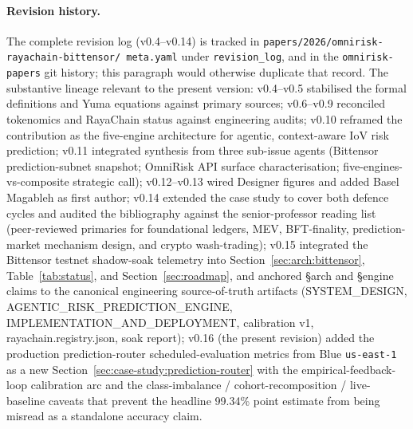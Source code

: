 \documentclass[11pt,a4paper]{article}
\begin{document}
\paragraph{Revision history.} The complete revision log
(v0.4--v0.14) is tracked in \texttt{papers/2026/omnirisk-rayachain-bittensor/
meta.yaml} under \texttt{revision\_log}, and in the \texttt{omnirisk-papers}
git history; this paragraph would otherwise duplicate that record. The
substantive lineage relevant to the present version: v0.4--v0.5 stabilised the
formal definitions and Yuma equations against primary sources;
v0.6--v0.9 reconciled tokenomics and RayaChain status against engineering
audits; v0.10 reframed the contribution as the five-engine architecture for
agentic, context-aware IoV risk prediction; v0.11 integrated synthesis from
three sub-issue agents (Bittensor prediction-subnet snapshot; OmniRisk API
surface characterisation; five-engines-vs-composite strategic call);
v0.12--v0.13 wired Designer figures and added Basel Magableh as first author;
v0.14 extended the case study to cover both defence cycles and audited the
bibliography against the senior-professor reading list (peer-reviewed primaries
for foundational ledgers, MEV, BFT-finality, prediction-market mechanism design,
and crypto wash-trading); v0.15 integrated the Bittensor testnet shadow-soak telemetry into
Section~\ref{sec:arch:bittensor}, Table~\ref{tab:status}, and
Section~\ref{sec:roadmap}, and anchored §arch and §engine claims to the
canonical engineering source-of-truth artifacts (SYSTEM\_DESIGN,
AGENTIC\_RISK\_PREDICTION\_ENGINE, IMPLEMENTATION\_AND\_DEPLOYMENT,
calibration v1, rayachain.registry.json, soak report); v0.16 (the present
revision) added the production prediction-router scheduled-evaluation
metrics from Blue \texttt{us-east-1} as a new
Section~\ref{sec:case-study:prediction-router} with the empirical-feedback-loop
calibration arc and the class-imbalance / cohort-recomposition / live-baseline
caveats that prevent the headline 99.34\% point estimate from being misread
as a standalone accuracy claim.

\printbibliography
\end{document}
